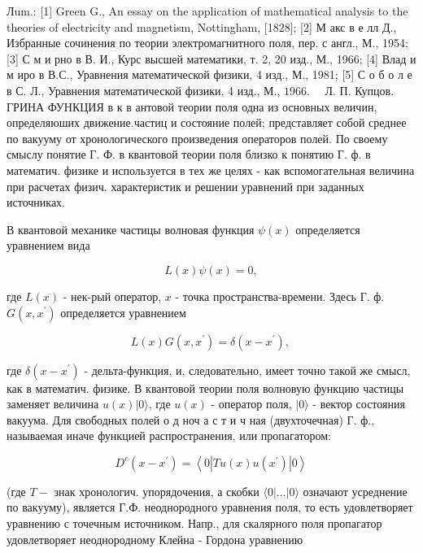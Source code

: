 \documentclass[10pt]{article}
\begin{document}
Лum.: [1] Green G., An essay on the application of mathematical analysis to the theories of electricity and magnetism, Nottingham, [1828]; [2] М акс в е лл Д., Избранные сочинения по теории электромагнитного поля, пер. с англ., М., 1954; [3] С м и рно в В. И., Курс высшей математики, т. 2, 20 изд., М., 1966; [4] Влад и м иро в В.С., Уравнения математической физики, 4 изд., М., 1981; [5] С о б о л е в С. Л., Уравнения математической физики, 4 изд., М., $1966 . \quad$ Л. П. Купцов. ГРИНА ФУНКЦИЯ в к в антовой теории поля одна из основных величин, определяюших движение.частиц и состояние полей; представляет собой среднее по вакууму от хронологического произведения операторов полей. По своему смыслу понятие Г. Ф. в квантовой теории поля близко к понятию Г. ф. в математич. физике и используется в тех же целях - как вспомогательная величина при расчетах физич. характеристик и решении уравнений при заданных источниках.



В квантовой механике частицы волновая функция $\psi(x)$ определяется уравнением вида



\[

L(x) \psi(x)=0,

\]



где $L(x)$ - нек-рый оператор, $x$ - точка пространства-времени. Здесь Г. ф. $G\left(x, x^{\prime}\right)$ определяется уравнением



\[

L(x) G\left(x, x^{\prime}\right)=\delta\left(x-x^{\prime}\right) \text {, }

\]



где $\delta\left(x-x^{\prime}\right)$ - дельта-функция, и, следовательно, имеет точно такой же смысл, как в математич. физике. В квантовой теории поля волновую функцию частицы заменяет величина $u(x)|0\rangle$, где $u(x)$ - оператор поля, $|0\rangle$ - вектор состояния вакуума. Для свободных полей о д ноч а с т и ч ная (двухточечная) Г. ф., называемая иначе функцией распространения, или пропагатором:



\[

D^{c}\left(x-x^{\prime}\right)=\left\langle 0\left|T u(x) u\left(x^{\prime}\right)\right| 0\right\rangle

\]



(где $T-$ знак хронологич. упорядочения, а скобки $\langle 0|\ldots| 0\rangle$ означают усреднение по вакууму), является Г.Ф. неоднородного уравнения поля, то есть удовлетворяет уравнению с точечным источником. Напр., для скалярного поля пропагатор удовлетворяет неоднородному Клейна - Гордона уравнению
\end{document}
